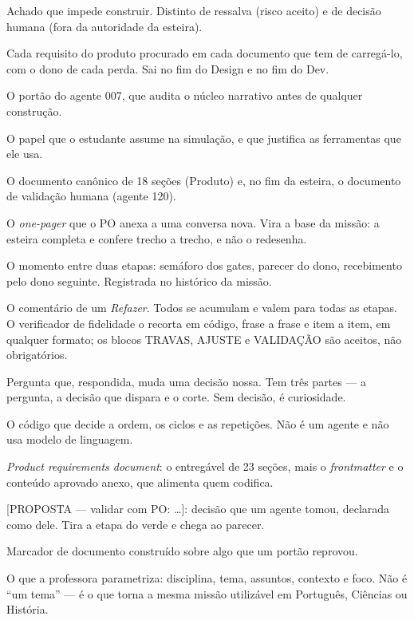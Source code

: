 \documentclass[11pt,a4paper]{article}
\newcommand{\cod}[1]{{\ttfamily\small #1}}
\begin{document}
\begin{description}[leftmargin=3.5cm,style=sameline,font=\sffamily\bfseries\color{unNavy},itemsep=3pt]
  \item[Impedimento] Achado que impede construir. Distinto de ressalva (risco aceito) e de decisão humana (fora da autoridade da esteira).
  \item[Matriz de rastreabilidade] Cada requisito do produto procurado em cada documento que tem de carregá-lo, com o dono de cada perda. Sai no fim do Design e no fim do Dev.
  \item[Micro-gate] O portão do agente 007, que audita o núcleo narrativo antes de qualquer construção.
  \item[Ofício] O papel que o estudante assume na simulação, e que justifica as ferramentas que ele usa.
  \item[\emph{One-pager}] O documento canônico de 18 seções (Produto) e, no fim da esteira, o documento de validação humana (agente 120).
  \item[\emph{One-pager} do PO] O \emph{one-pager} que o PO anexa a uma conversa nova. Vira a base da missão: a esteira completa e confere trecho a trecho, e não o redesenha.
  \item[Passagem] O momento entre duas etapas: semáforo dos gates, parecer do dono, recebimento pelo dono seguinte. Registrada no histórico da missão.
  \item[Pedido do PO] O comentário de um \emph{Refazer}. Todos se acumulam e valem para todas as etapas. O verificador de fidelidade o recorta em código, frase a frase e item a item, em qualquer formato; os blocos TRAVAS, AJUSTE e VALIDAÇÃO são aceitos, não obrigatórios.
  \item[Pergunta de produto] Pergunta que, respondida, muda uma decisão nossa. Tem três partes --- a pergunta, a decisão que dispara e o corte. Sem decisão, é curiosidade.
  \item[Orquestrador] O código que decide a ordem, os ciclos e as repetições. Não é um agente e não usa modelo de linguagem.
  \item[PRD] \emph{Product requirements document}: o entregável de 23 seções, mais o \emph{frontmatter} e o conteúdo aprovado anexo, que alimenta quem codifica.
  \item[\cod{[PROPOSTA]}] \cod{[PROPOSTA — validar com PO: \ldots]}: decisão que um agente tomou, declarada como dele. Tira a etapa do verde e chega ao parecer.
  \item[\cod{[PROVISÓRIO]}] Marcador de documento construído sobre algo que um portão reprovou.
  \item[Recorte da aula] O que a professora parametriza: disciplina, tema, assuntos, contexto e foco. Não é ``um tema'' --- é o que torna a mesma missão utilizável em Português, Ciências ou História.

\end{description}
\end{document}
